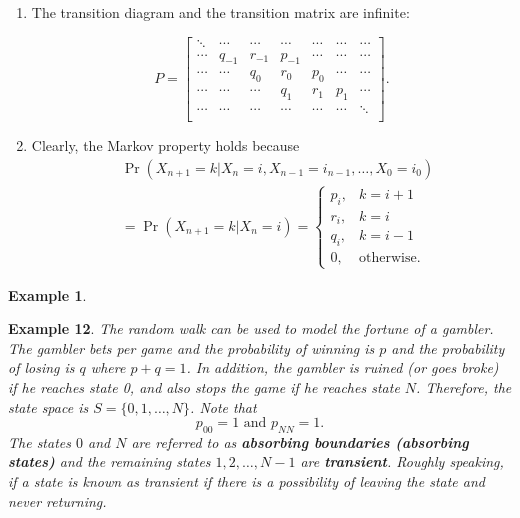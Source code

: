 \documentclass[
]{book}
\theoremstyle{definition}
\theoremstyle{definition}
\newtheorem{example}{Example}[chapter]
\theoremstyle{definition}
\theoremstyle{definition}
\theoremstyle{remark}
\begin{document}
\begin{enumerate}
\def\labelenumi{\arabic{enumi}.}
\item
  The transition diagram and the transition matrix are infinite:

  \[P = \begin{bmatrix}
      \ddots & \cdots & \cdots & \cdots & \cdots & \cdots  & \cdots    \\
      \cdots & q_{-1} & r_{-1}  & p_{-1}  & \cdots & \cdots  & \cdots  \\
      \cdots & \cdots & q_{0} & r_{0}  & p_{0}  & \cdots   & \cdots  \\
      \cdots & \cdots & \cdots & q_{1} & r_{1}  & p_{1}    & \cdots    \\
      \cdots & \cdots & \cdots & \cdots & \cdots  & \cdots  & \ddots   \\
  \end{bmatrix}.\]
\item
  Clearly, the Markov property holds because \[\begin{aligned}
      &\Pr(X_{n+1} = k | X_n = i, X_{n-1} = i_{n-1}, \ldots, X_0 = i_0)  \\
      &= \Pr(X_{n+1} = k | X_n = i) =
      \begin{cases}
                 p_i,              & k = i+1\\
                 r_i,              & k = i\\
                 q_i,               & k = i-1\\
                 0,       & \text{otherwise}.
             \end{cases}\end{aligned}\]
\end{enumerate}

\begin{example}
\protect\hypertarget{exm:simpleRW}{}\label{exm:simpleRW}

\textbf{Example 12}. \emph{The random walk can be used to model the fortune of a
gambler. The gambler bets per game and the probability of winning is \(p\)
and the probability of losing is \(q\) where \(p + q = 1\). In addition, the
gambler is ruined (or goes broke) if he reaches state 0, and also stops
the game if he reaches state \(N\). Therefore, the state space is
\(S = \{0, 1, \ldots, N\}\). Note that
\[p_{00} = 1 \text { and } p_{NN} = 1.\] The states \(0\) and \(N\) are
referred to as \textbf{absorbing boundaries (absorbing states)} and the
remaining states \(1,2,\ldots,N-1\) are \textbf{transient}. Roughly speaking,
if a state is known as transient if there is a possibility of leaving
the state and never returning.}

\end{example}
\end{document}
